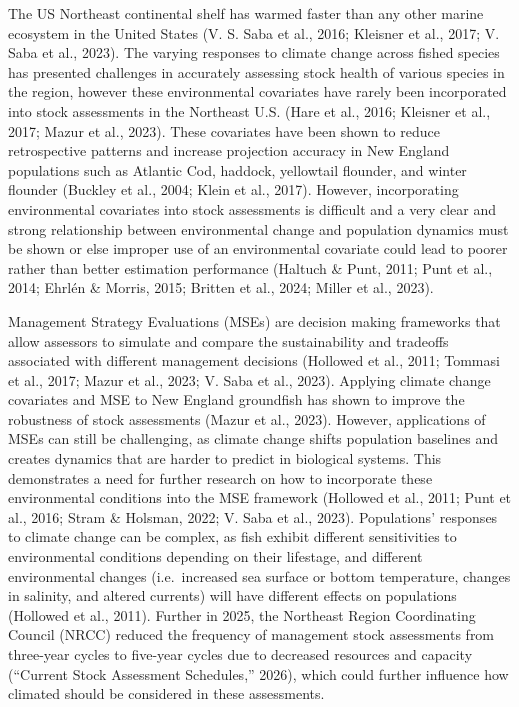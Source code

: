 \documentclass[
  12pt,
]{article}
\begin{document}
The US Northeast continental shelf has warmed faster than any other marine ecosystem in the United States (V. S. Saba et al., 2016; Kleisner et al., 2017; V. Saba et al., 2023). The varying responses to climate change across fished species has presented challenges in accurately assessing stock health of various species in the region, however these environmental covariates have rarely been incorporated into stock assessments in the Northeast U.S. (Hare et al., 2016; Kleisner et al., 2017; Mazur et al., 2023). These covariates have been shown to reduce retrospective patterns and increase projection accuracy in New England populations such as Atlantic Cod, haddock, yellowtail flounder, and winter flounder (Buckley et al., 2004; Klein et al., 2017). However, incorporating environmental covariates into stock assessments is difficult and a very clear and strong relationship between environmental change and population dynamics must be shown or else improper use of an environmental covariate could lead to poorer rather than better estimation performance (Haltuch \& Punt, 2011; Punt et al., 2014; Ehrlén \& Morris, 2015; Britten et al., 2024; Miller et al., 2023).

Management Strategy Evaluations (MSEs) are decision making frameworks that allow assessors to simulate and compare the sustainability and tradeoffs associated with different management decisions (Hollowed et al., 2011; Tommasi et al., 2017; Mazur et al., 2023; V. Saba et al., 2023). Applying climate change covariates and MSE to New England groundfish has shown to improve the robustness of stock assessments (Mazur et al., 2023). However, applications of MSEs can still be challenging, as climate change shifts population baselines and creates dynamics that are harder to predict in biological systems. This demonstrates a need for further research on how to incorporate these environmental conditions into the MSE framework (Hollowed et al., 2011; Punt et al., 2016; Stram \& Holsman, 2022; V. Saba et al., 2023). Populations' responses to climate change can be complex, as fish exhibit different sensitivities to environmental conditions depending on their lifestage, and different environmental changes (i.e.~increased sea surface or bottom temperature, changes in salinity, and altered currents) will have different effects on populations (Hollowed et al., 2011). Further in 2025, the Northeast Region Coordinating Council (NRCC) reduced the frequency of management stock assessments from three-year cycles to five-year cycles due to decreased resources and capacity ({``Current {Stock Assessment Schedules},''} 2026), which could further influence how climated should be considered in these assessments.
\end{document}
